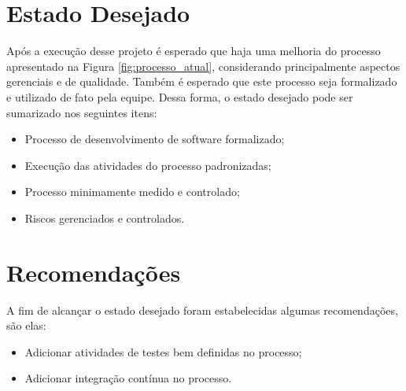 \section{Estado Desejado}

Após a execução desse projeto é esperado que haja uma melhoria do processo apresentado na Figura \ref{fig:processo_atual}, 
considerando principalmente aspectos gerenciais e de qualidade. Também é esperado que este processo seja formalizado e utilizado
de fato pela equipe. Dessa forma, o estado desejado pode ser sumarizado nos seguintes itens:

\begin{itemize}
	\item Processo de desenvolvimento de software formalizado;
	\item Execução das atividades do processo padronizadas;
	\item Processo minimamente medido e controlado;
	\item Riscos gerenciados e controlados.

\end{itemize}

	
\section{Recomendações}

A fim de alcançar o estado desejado foram estabelecidas algumas recomendações, são elas: 

\begin{itemize}
    \item Adicionar atividades de testes bem definidas no processo;
    \item Adicionar integração contínua no processo.
\end{itemize}
